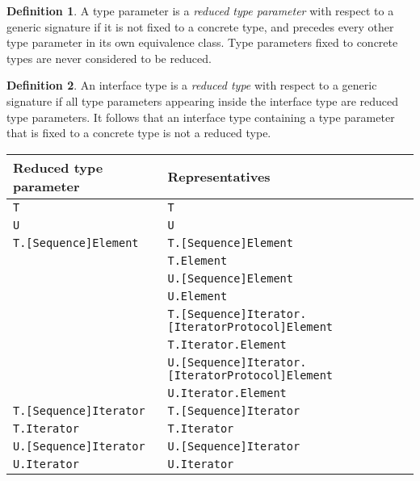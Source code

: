 \documentclass[a4paper,headsepline,bibliography=totoc,toc=flat,fleqn,twoside=semi]{scrbook}
\theoremstyle{definition}
\newtheorem{definition}{Definition}[chapter]
\theoremstyle{definition}
\theoremstyle{definition}
\begin{document}
\begin{definition}
A type parameter is a \emph{reduced type parameter} with respect to a generic signature if it is not fixed to a concrete type, and precedes every other type parameter in its own equivalence class. Type parameters fixed to concrete types are never considered to be reduced.
\end{definition}

\begin{definition}
An interface type is a \emph{reduced type} with respect to a generic signature if all type parameters appearing inside the interface type are reduced type parameters. It follows that an interface type containing a type parameter that is fixed to a concrete type is not a reduced type.
\end{definition}

\begin{table}\label{equivalenceclassestable}
\begin{tabular}{|l|l|}
\hline
Reduced type parameter&Representatives\\
\hline
\texttt{T}&\texttt{T}\\
\hline
\texttt{U}&\texttt{U}\\
\hline
\texttt{T.[Sequence]Element}&\texttt{T.[Sequence]Element}\\
&\texttt{T.Element}\\
&\texttt{U.[Sequence]Element}\\
&\texttt{U.Element}\\
&\texttt{T.[Sequence]Iterator.[IteratorProtocol]Element}\\
&\texttt{T.Iterator.Element}\\
&\texttt{U.[Sequence]Iterator.[IteratorProtocol]Element}\\
&\texttt{U.Iterator.Element}\\
\hline
\texttt{T.[Sequence]Iterator}&\texttt{T.[Sequence]Iterator}\\
\texttt{T.Iterator}&\texttt{T.Iterator}\\
\hline
\texttt{U.[Sequence]Iterator}&\texttt{U.[Sequence]Iterator}\\
\texttt{U.Iterator}&\texttt{U.Iterator}\\
\hline
\end{tabular}
\end{table}
\end{document}
